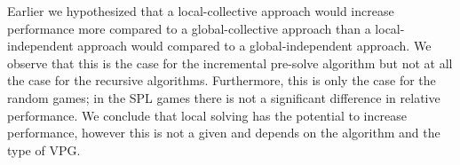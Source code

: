 Earlier we hypothesized that a local-collective approach would increase performance more compared to a global-collective approach than a local-independent approach would compared to a global-independent approach. We observe that this is the case for the incremental pre-solve algorithm but not at all the case for the recursive algorithms. Furthermore, this is only the case for the random games; in the SPL games there is not a significant difference in relative performance. We conclude that local solving has the potential to increase performance, however this is not a given and depends on the algorithm and the type of VPG.